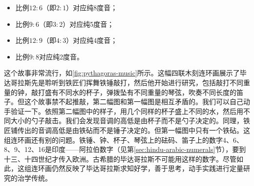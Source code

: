 \documentclass[b5paper]{ctexart}
\begin{document}
\begin{itemize}
\item 比例$12:6$（即$2:1$）对应纯8度音；
\item 比例$9:6$（即$3:2$）对应纯5度音；
\item 比例$12:9$（即$4:3$）对应纯4度音；
\item 比例$9:8$对应纯2度音。
\end{itemize}


这个故事非常流行，如\ref{fig:pythagoras-music}所示。这幅四联木刻连环画展示了毕达哥拉斯先是聆听到铁匠们挥舞铁锤敲打，然后他开始进行研究，包括敲打不同重量的钟，敲打盛有不同水的杯子，弹拨坠有不同重量的琴弦，吹奏不同长度的笛子。但这个故事禁不起推敲，第二幅图和第一幅图是相互矛盾的。我们可以自己动手验证一下。依照第二幅图中的样子，用几个同样的杯子盛上不同的水，然后用不同大小的勺子敲击。我们会发现音调的高低是由杯子而不是勺子决定的。同理，铁匠铺传出的音调高低是由铁砧而不是锤子决定的。但第一幅图中只有一个铁砧。这组连环画还有别的问题。铁锤、钟、杯子、琴弦上的砝码、笛子上的数字4、6、8、9、12、16是印度——阿拉伯数字（见第\ref{sec:hindu-arabic-numerals}节），要到十三、十四世纪才传入欧洲。古希腊的毕达哥拉斯不可能用这样的数字。尽管如此，这组连环画仍然反映了毕达哥拉斯求知好学，善于思考，动手实践进行定量研究的治学传统。
\end{document}
